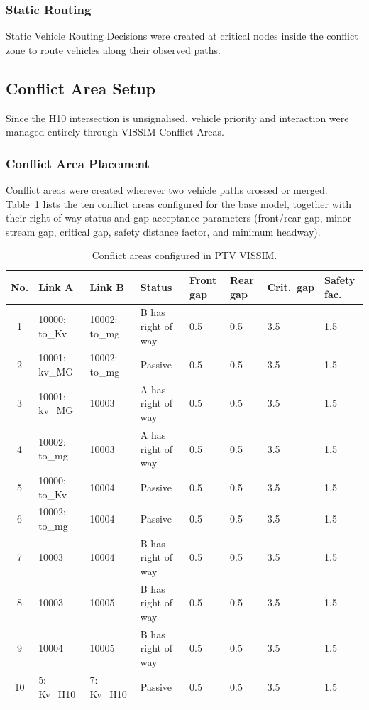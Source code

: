 \documentclass[11pt]{article}
\begin{document}
\subsubsection{Static Routing}
Static Vehicle Routing Decisions were created at critical nodes inside the conflict zone to route
vehicles along their observed paths.

\subsection{Conflict Area Setup}
Since the H10 intersection is unsignalised, vehicle priority and interaction were managed entirely
through VISSIM Conflict Areas.

\subsubsection{Conflict Area Placement}
Conflict areas were created wherever two vehicle paths crossed or merged. Table~\ref{tab:conflictareas}
lists the ten conflict areas configured for the base model, together with their right-of-way status and
gap-acceptance parameters (front/rear gap, minor-stream gap, critical gap, safety distance factor, and
minimum headway).

\begin{table}[H]
  \centering
  \footnotesize
  \caption{Conflict areas configured in PTV VISSIM.}
  \label{tab:conflictareas}
  \begin{tabular}{@{}cp{1.9cm}p{1.9cm}p{2.2cm}p{1.1cm}p{1.1cm}p{1.1cm}p{1.3cm}@{}}
    \toprule
    \textbf{No.} & \textbf{Link A} & \textbf{Link B} & \textbf{Status} & \textbf{Front gap} & \textbf{Rear gap} & \textbf{Crit.\ gap} & \textbf{Safety fac.} \\
    \midrule
    1  & 10000: to\_Kv  & 10002: to\_mg & B has right of way & 0.5 & 0.5 & 3.5 & 1.5 \\
    2  & 10001: kv\_MG  & 10002: to\_mg & Passive             & 0.5 & 0.5 & 3.5 & 1.5 \\
    3  & 10001: kv\_MG  & 10003        & A has right of way  & 0.5 & 0.5 & 3.5 & 1.5 \\
    4  & 10002: to\_mg  & 10003        & A has right of way  & 0.5 & 0.5 & 3.5 & 1.5 \\
    5  & 10000: to\_Kv  & 10004        & Passive             & 0.5 & 0.5 & 3.5 & 1.5 \\
    6  & 10002: to\_mg  & 10004        & Passive             & 0.5 & 0.5 & 3.5 & 1.5 \\
    7  & 10003         & 10004        & B has right of way  & 0.5 & 0.5 & 3.5 & 1.5 \\
    8  & 10003         & 10005        & B has right of way  & 0.5 & 0.5 & 3.5 & 1.5 \\
    9  & 10004         & 10005        & B has right of way  & 0.5 & 0.5 & 3.5 & 1.5 \\
    10 & 5: Kv\_H10     & 7: Kv\_H10   & Passive             & 0.5 & 0.5 & 3.5 & 1.5 \\
    \bottomrule
  \end{tabular}
\end{table}
\end{document}
